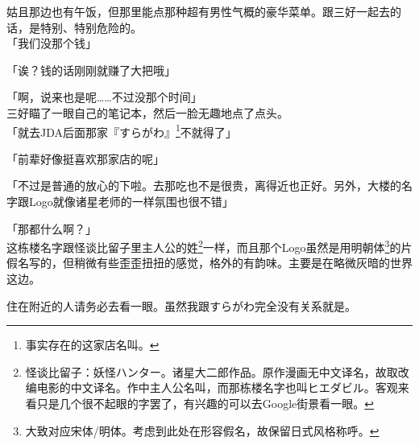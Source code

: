 姑且那边也有午饭，但那里能点那种超有男性气概的豪华菜单。跟三好一起去的话，是特别、特别危险的。\\

「我们没那个钱」

「诶？钱的话刚刚就赚了大把哦」

「啊，说来也是呢……不过没那个时间」\\

三好瞄了一眼自己的笔记本，然后一脸无趣地点了点头。\\

「就去JDA后面那家『すらがわ』\footnote{事实存在的这家店名叫。}不就得了」

「前辈好像挺喜欢那家店的呢」

「不过是普通的放心的下啦。去那吃也不是很贵，离得近也正好。另外，大楼的名字跟Logo就像诸星老师的一样氛围也很不错」

「那都什么啊？」\\

这栋楼名字跟怪谈比留子里主人公的姓\footnote{怪谈比留子：妖怪ハンター。诸星大二郎作品。原作漫画无中文译名，故取改编电影的中文译名。作中主人公名叫，而那栋楼名字也叫ヒエダビル。客观来看只是几个很不起眼的字罢了，有兴趣的可以去Google街景看一眼。}一样，而且那个Logo虽然是用明朝体\footnote{大致对应宋体/明体。考虑到此处在形容假名，故保留日式风格称呼。}的片假名写的，但稍微有些歪歪扭扭的感觉，格外的有韵味。主要是在略微灰暗的世界这边。

住在附近的人请务必去看一眼。虽然我跟すらがわ完全没有关系就是。\\

